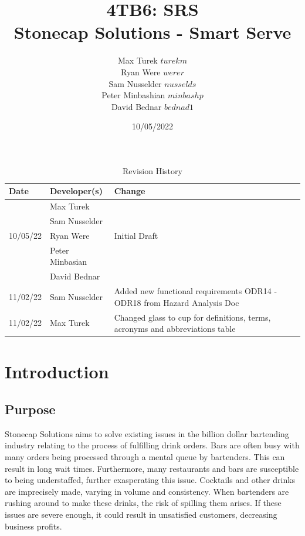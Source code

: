 \documentclass{article}
\title{\textbf{4TB6: SRS}\\
\addlinespace
\addlinespace
\addlinespace
\addlinespace
\large \textbf{Stonecap Solutions - Smart Serve}
\addlinespace
\addlinespace
\addlinespace
\addlinespace}
\author{Max Turek $turekm$\\Ryan Were $werer$\\Sam Nusselder $nusselds$\\Peter Minbashian $minbashp$\\David Bednar $bednad1$}
\date{10/05/2022}
\begin{document}
\maketitle
\newpage
\tableofcontents

\newpage

    \begin{table}[hp]
    \caption{Revision History} \label{TblRevisionHistory}
    \hline
        \begin{tabularx}{\textwidth}{llX}
        \toprule
        \textbf{Date} & \textbf{Developer(s)} & \textbf{Change}\\
        \midrule
        & Max Turek & \\
        & Sam Nusselder &  \\
        10/05/22 & Ryan Were & Initial Draft\\
        & Peter Minbasian & \\
        & David Bednar & \\
        \bottomrule
        \hline
        \toprule
        \midrule
        11/02/22 & Sam Nusselder & Added new functional requirements ODR14 - ODR18 from Hazard Analysis Doc\\
        \bottomrule
        \hline
        \toprule
        \midrule
        11/02/22 & Max Turek & Changed glass to cup for definitions, terms, acronyms and abbreviations table \\
        \bottomrule
        \hline
        \end{tabularx}
    \end{table}

\newpage
\section{Introduction}
\subsection{Purpose} %
    Stonecap Solutions aims to solve existing issues in the billion dollar bartending industry relating to the process of fulfilling drink orders. Bars are often busy with many orders being processed through a mental queue by bartenders. This can result in long wait times. Furthermore, many restaurants and bars are susceptible to being understaffed, further exasperating this issue. Cocktails and other drinks are imprecisely made, varying in volume and consistency. When bartenders are rushing around to make these drinks, the risk of spilling them arises. If these issues are severe enough, it could result in unsatisfied customers, decreasing business profits. \\
\end{document}
